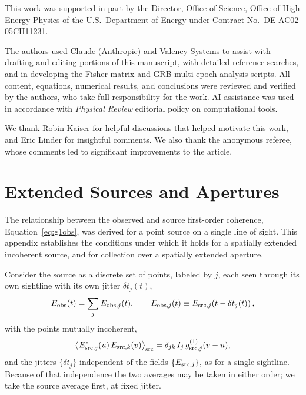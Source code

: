\documentclass[aps,prd,onecolumn,amsmath,amssymb]{revtex4-2}
\begin{document}
\begin{acknowledgments}
This work was supported in part by the Director, Office of Science, Office of
High Energy Physics of the U.S.\ Department of Energy under Contract No.\
DE-AC02-05CH11231.

The authors used Claude (Anthropic) and Valency Systems to assist with drafting and editing portions of this manuscript, with detailed reference searches, and in developing the Fisher-matrix and GRB multi-epoch analysis scripts. All content, equations, numerical results, and conclusions were reviewed and verified by the authors, who take full responsibility for the work.  AI assistance was used in accordance with \textit{Physical Review} editorial policy on computational tools.

We thank Robin Kaiser for helpful discussions that helped motivate this work, and Eric Linder for insightful comments.
We also thank the anonymous referee, whose comments led to
significant improvements to the article.
\end{acknowledgments}




\appendix

\section{Extended Sources and Apertures}
\label{app:extended}

The relationship between the observed and source first-order
coherence, Equation~\eqref{eq:g1obs}, was derived for a point source on a
single line of sight.  This appendix establishes the conditions under which
it holds for a spatially extended incoherent source, and for collection over
a spatially extended aperture.

Consider the source as a discrete set of points, labeled by $j$, each
seen through its own sightline with its own jitter $\delta t_j(t)$,
\begin{equation}
  E_{\rm obs}(t) = \sum_j E_{{\rm obs},j}(t),
  \qquad
  E_{{\rm obs},j}(t) \equiv E_{{\rm src},j}\!\left(t-\delta t_j(t)\right),
  \label{eq:Eobs_ext}
\end{equation}
with the points mutually incoherent,
\begin{equation}
  \big\langle E^*_{{\rm src},j}(u)\,E_{{\rm src},k}(v)\big\rangle_{\rm src}
    = \delta_{jk}\,I_j\,g^{(1)}_{{\rm src},j}(v-u),
  \label{eq:incoh}
\end{equation}
and the jitters $\{\delta t_j\}$ independent of the fields
$\{E_{{\rm src},j}\}$, as for a single sightline.  Because of that
independence the two averages may be taken in either order; we take the
source average first, at fixed jitter.
\end{document}
